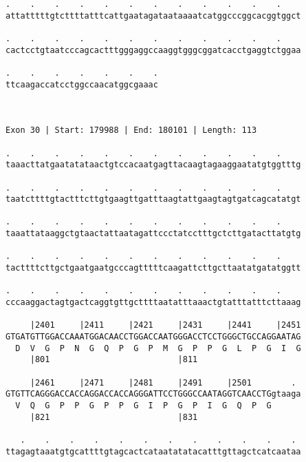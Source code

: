 \documentclass{article}
\begin{document}
\begin{Verbatim}
.    .    .    .    .    .    .    .    .    .    .    .    
attatttttgtcttttatttcattgaatagataataaaatcatggcccggcacggtggct
                                                            
.    .    .    .    .    .    .    .    .    .    .    .    
cactcctgtaatcccagcactttgggaggccaaggtgggcggatcacctgaggtctggaa
                                                            
.    .    .    .    .    .    .
ttcaagaccatcctggccaacatggcgaaac
                               
                               
 
Exon 30 | Start: 179988 | End: 180101 | Length: 113
 
.    .    .    .    .    .    .    .    .    .    .    .    
taaacttatgaatatataactgtccacaatgagttacaagtagaaggaatatgtggtttg
                                                            
.    .    .    .    .    .    .    .    .    .    .    .    
taatcttttgtactttcttgtgaagttgatttaagtattgaagtagtgatcagcatatgt
                                                            
.    .    .    .    .    .    .    .    .    .    .    .    
taaattataaggctgtaactattaatagattccctatcctttgctcttgatacttatgtg
                                                            
.    .    .    .    .    .    .    .    .    .    .    .    
tacttttcttgctgaatgaatgcccagtttttcaagattcttgcttaatatgatatggtt
                                                            
.    .    .    .    .    .    .    .    .    .    .    .    
cccaaggactagtgactcaggtgttgcttttaatatttaaactgtatttatttcttaaag
                                                            
     |2401     |2411     |2421     |2431     |2441     |2451
GTGATGTTGGACCAAATGGACAACCTGGACCAATGGGACCTCCTGGGCTGCCAGGAATAG
  D  V  G  P  N  G  Q  P  G  P  M  G  P  P  G  L  P  G  I  G
     |801                          |811                     
  
     |2461     |2471     |2481     |2491     |2501        . 
GTGTTCAGGGACCACCAGGACCACCAGGGATTCCTGGGCCAATAGGTCAACCTGgtaaga
  V  Q  G  P  P  G  P  P  G  I  P  G  P  I  G  Q  P  G      
     |821                          |831                     
  
   .    .    .    .    .    .    .    .    .    .    .    . 
ttagagtaaatgtgcattttgtagcactcataatatatacatttgttagctcatcaataa
                                                            

\end{Verbatim}
\end{document}
